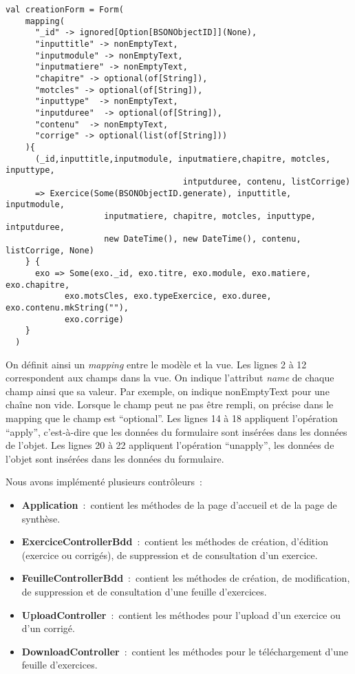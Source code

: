 \lstset{style=customScala}
\begin{lstlisting}
val creationForm = Form(
    mapping(
      "_id" -> ignored[Option[BSONObjectID]](None),
      "inputtitle" -> nonEmptyText,
      "inputmodule" -> nonEmptyText,
      "inputmatiere" -> nonEmptyText,
      "chapitre" -> optional(of[String]),
      "motcles" -> optional(of[String]),
      "inputtype"  -> nonEmptyText,
      "inputduree"  -> optional(of[String]),
      "contenu"  -> nonEmptyText,
      "corrige" -> optional(list(of[String]))
    ){
      (_id,inputtitle,inputmodule, inputmatiere,chapitre, motcles, inputtype, 
      								intputduree, contenu, listCorrige)
      => Exercice(Some(BSONObjectID.generate), inputtitle, inputmodule,
					inputmatiere, chapitre, motcles, inputtype, intputduree,
					new DateTime(), new DateTime(), contenu, listCorrige, None)
    } {
      exo => Some(exo._id, exo.titre, exo.module, exo.matiere, exo.chapitre, 
     		exo.motsCles, exo.typeExercice, exo.duree, exo.contenu.mkString(""), 
     		exo.corrige)
    }
  )
\end{lstlisting} 

On définit ainsi un \emph{mapping} entre le modèle et la vue. Les lignes 2 à 12 correspondent aux champs dans la vue. On indique l'attribut \emph{name} de chaque champ ainsi que sa valeur. Par exemple, on indique nonEmptyText pour une chaîne non vide. Lorsque le champ peut ne pas être rempli, on précise dans le mapping que le champ est \enquote{optional}. Les lignes 14 à 18 appliquent l'opération \enquote{apply}, c'est-à-dire que les données du formulaire sont insérées dans les données de l'objet. Les lignes 20 à 22 appliquent l'opération \enquote{unapply}, les données de l'objet sont insérées dans les données du formulaire.

Nous avons implémenté plusieurs contrôleurs~:
\medskip
\begin{itemize}
\item \textbf{Application}~:~contient les méthodes de la page d'accueil et de la page de synthèse. 
\item \textbf{ExerciceControllerBdd}~:~contient les méthodes de création, d'édition (exercice ou corrigés), de suppression et de consultation d'un exercice. 
\item \textbf{FeuilleControllerBdd}~:~contient les méthodes de création, de modification, de suppression et de consultation d'une feuille d'exercices. 
\item \textbf{UploadController}~:~contient les méthodes pour l'upload d'un exercice ou d'un corrigé.
\item \textbf{DownloadController}~:~contient les méthodes pour le téléchargement d'une feuille d'exercices.
\end{itemize}  

